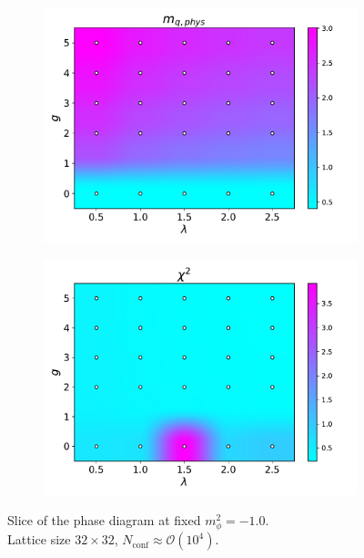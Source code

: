 \begin{figure}[htp]
\begin{subfigure}[b]{0.48\textwidth}
        \includegraphics[width=\textwidth]{figures/phase_diagram/g-lam/phase_diagram_mqphys.pdf}
    \end{subfigure}
    \begin{subfigure}[b]{0.48\textwidth}
        \includegraphics[width=\textwidth]{figures/phase_diagram/g-lam/phase_diagram_chi2.pdf}
    \end{subfigure}
    \caption{Slice of the phase diagram at fixed $m_\phi^2 = -1.0$. \\ Lattice size $32 \times 32$, $N_\text{conf} \approx \mathcal{O}(10^4)$.}
    \label{fig:phase_diagram_g_lam}
\end{figure}\\

